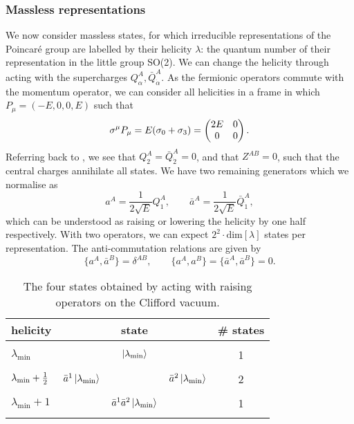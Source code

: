 \subsubsection*{Massless representations}

We now consider massless states, for which irreducible representations of the Poincar\'e group are labelled by their helicity $\lambda$: the quantum number of their representation in the little group SO(2). We can change the helicity through acting with the supercharges $Q^A_{\alpha}, \bar{Q}^A_{\dot{\alpha}}$. As the fermionic operators commute with the momentum operator, we can consider all helicities in a frame in which $P_\mu = (-E,0,0,E)$ such that
\begin{equation*}
	\sigma^\mu P_\mu = E(\sigma_0 + \sigma_3) = \begin{pmatrix} 2E & 0 \\ 0 & 0\end{pmatrix} .
\end{equation*}
Referring back to , we see that $Q^A_{2} = \bar{Q}^A_{\dot{2}} = 0$, and that $Z^{AB} = 0$, such that the central charges annihilate all states. We have two remaining generators which we normalise as
\begin{equation*}
	a^A = \frac{1}{2\sqrt{E}} Q^A_1, \qquad \bar{a}^A = \frac{1}{2\sqrt{E}} \bar{Q}^A_{\dot{1}},
\end{equation*}
which can be understood as raising or lowering the helicity by one half respectively. With two operators, we can expect $2^2 \cdot \text{dim} [\lambda]$ states per representation. The anti-commutation relations are given by
\begin{equation*}
	\{a^A, \bar{a}^B\} = \delta^{AB}, \qquad \{a^A, a^B\} = \{\bar{a}^A, \bar{a}^B\} = 0.
\end{equation*} 

\begin{table}[!h]
\centering
\def\arraystretch{1}
\begin{tabular}{l|ccc|c}
helicity &   & \multicolumn{1}{c}{state} & & \# states  \\ \hline
 &  &  &  &  \\
$\lambda_{\text{min}}$   &   &  $\ket{\lambda_{\text{min}}}$ & &  1  \\
 &  &  & &  \\
$\lambda_{\text{min}} + \frac{1}{2}$     & $\bar{a}^1  \ket{\lambda_{\text{min}}}$ &                           & $\bar{a}^2 \ket{\lambda_{\text{min}}}$ & 2 \\
 &  &  & &  \\
$\lambda_{\text{min}} + 1$ &   & $\bar{a}^1 \bar{a}^2 \ket{\lambda_{\text{min}}}$                         &  & 1  \\
 &  &  &   & 
\end{tabular}
\caption[The four states obtained by acting with raising operators on the Clifford vacuum]{The four states obtained by acting with raising operators on the Clifford vacuum.}
\label{table:fourstates}
\end{table}

